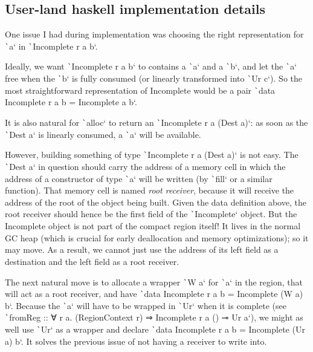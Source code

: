 \documentclass[english]{jflart}
\begin{document}
\subsection{User-land haskell implementation details}
 
One issue I had during implementation was choosing the right representation for \texttt`a` in \texttt`Incomplete r a b`.

Ideally, we want \texttt`Incomplete r a b` to contains a \texttt`a` and a \texttt`b`, and let the \texttt`a` free when the \texttt`b` is fully consumed (or linearly transformed into \texttt`Ur c`). So the most straightforward representation of Incomplete would be a pair \texttt`data Incomplete r a b = Incomplete a b`.

It is also natural for \texttt`alloc` to return an \texttt`Incomplete r a (Dest a)`: as soon as the \texttt`Dest a` is linearly consumed, a \texttt`a` will be available.

However, building something of type \texttt`Incomplete r a (Dest a)` is not easy. The \texttt`Dest a` in question should carry the address of a memory cell in which the address of a constructor of type \texttt`a` will be written (by \texttt`fill` or a similar function). That memory cell is named \emph{root receiver}, because it will receive the address of the root of the object being built. Given the data definition above, the root receiver should hence be the first field of the \texttt`Incomplete` object. But the Incomplete object is not part of the compact region itself! It lives in the normal GC heap (which is crucial for early deallocation and memory optimizations); so it may move. As a result, we cannot just use the address of its left field as a destination and the left field as a root receiver.

The next natural move is to allocate a wrapper \texttt`W a` for \texttt`a` in the region, that will act as a root receiver, and have \texttt`data Incomplete r a b = Incomplete (W a) b`. Because the \texttt`a` will have to be wrapped in \texttt`Ur` when it is complete (see \texttt`fromReg :: ∀ r a. (RegionContext r) ⇒ Incomplete r a () ⊸ Ur a`), we might as well use \texttt`Ur` as a wrapper and declare \texttt`data Incomplete r a b = Incomplete (Ur a) b`. It solves the previous issue of not having a receiver to write into.
\end{document}
